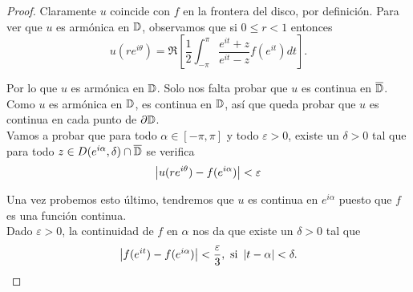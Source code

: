 \begin{proof}
    Claramente $u$ coincide con $f$ en la frontera del disco, por definición. Para ver que $u$ es armónica en $\mathbb{D}$, observamos que si $0 \leq r < 1$ entonces
    \begin{equation*}
        u(re^{i \theta}) = \Re \left[ \dfrac{1}{2} \int_{-\pi}^{\pi} \dfrac{e^{it} + z}{e^{it} - z} f(e^{it}) dt  \right].
    \end{equation*}

    Por lo que $u$ es armónica en $\mathbb{D}$. Solo nos falta probar que $u$ es continua en $\overline{\mathbb{D}}$. Como $u$ es armónica en $\mathbb{D}$, es continua en $\mathbb{D}$, así que queda probar que $u$ es continua en cada punto de $\partial \mathbb{D}$. \\

    Vamos a probar que para todo $\alpha \in [- \pi, \pi]$ y todo $\varepsilon > 0$, existe un $\delta > 0$ tal que para todo $z \in D(e^{i \alpha}, \delta) \cap \overline{\mathbb{D}}$ se verifica
    \begin{equation*}
        \left\lvert u(re^{i \theta}) - f(e^{i \alpha})\right\rvert < \varepsilon
    \end{equation*}

    Una vez probemos esto último, tendremos que $u$ es continua en $e^{i \alpha}$ puesto que $f$ es una función continua. \\

    Dado $\varepsilon > 0$, la continuidad de $f$ en $\alpha$ nos da que existe un $\delta > 0$ tal que
    \begin{equation*}
        \left\lvert f(e^{it}) - f(e^{i \alpha})\right\rvert < \frac{\varepsilon}{3}, \text{  si } \left\lvert t - \alpha\right\rvert < \delta.
    \end{equation*}


\end{proof}
